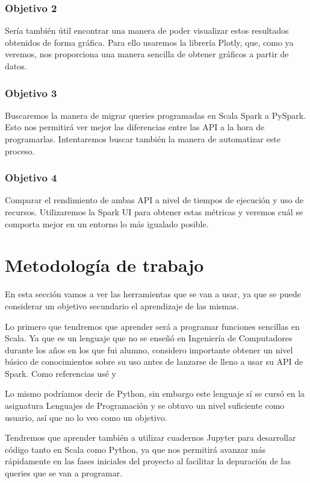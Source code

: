 \documentclass[12pt,twoside,titlepage]{report}
\begin{document}
\subsubsection{Objetivo 2}

Sería también útil encontrar una manera de poder visualizar estos resultados obtenidos de forma gráfica. Para ello usaremos la librería Plotly, que, como ya veremos, nos proporciona una manera sencilla de obtener gráficos a partir de datos.

\subsubsection{Objetivo 3}

Buscaremos la manera de migrar queries programadas en Scala Spark a PySpark. Esto nos permitirá ver mejor las diferencias entre las API a la hora de programarlas. Intentaremos buscar también la manera de automatizar este proceso.

\subsubsection{Objetivo 4}

Comparar el rendimiento de ambas API a nivel de tiempos de ejecución y uso de recursos. Utilizaremos la Spark UI para obtener estas métricas y veremos cuál se comporta mejor en un entorno lo más igualado posible.


\section{Metodología de trabajo}

En esta sección vamos a ver las herramientas que se van a usar, ya que se puede considerar un objetivo secundario el aprendizaje de las mismas.

Lo primero que tendremos que aprender será a programar funciones sencillas en Scala. Ya que es un lenguaje que no se enseñó en Ingeniería de Computadores durante los años en los que fui alumno, considero importante obtener un nivel básico de conocimientos sobre su uso antes de lanzarse de lleno a usar su API de Spark. Como referencias usé \cite{scalabook} y \cite{ScalaAPI}

Lo mismo podríamos decir de Python, sin embargo este lenguaje sí se cursó en la asignatura Lenguajes de Programación y se obtuvo un nivel suficiente como usuario, así que no lo veo como un objetivo.

Tendremos que aprender también a utilizar cuadernos Jupyter para desarrollar código tanto en Scala como Python, ya que nos permitirá avanzar más rápidamente en las fases iniciales del proyecto al facilitar la depuración de las queries que se van a programar.
\end{document}
